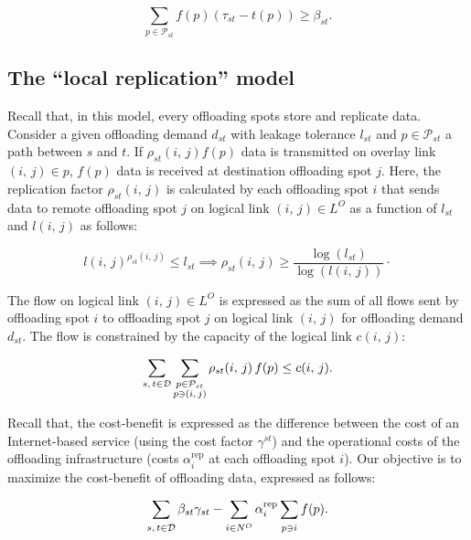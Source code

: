 \begin{equation}
    \sum_{p\in \mathcal{P}_{st}}f(p)\left(\tau_{st} - t(p)\right) \geq \beta_{st}.
    \label{eq:delay-constraint}
\end{equation}


\subsection{The ``local replication'' model}
\label{sec:rep-model}

Recall that, in this model, every offloading spots store and replicate data. Consider a given offloading demand $d_{st}$ with leakage tolerance $l_{st}$ and $p\in\mathcal{P}_{st}$ a path between $s$ and $t$. If $\rho_{st}(i,\,j)f(p)$ data is transmitted on overlay link $(i,\,j)\in p$, $f(p)$ data is received at destination offloading spot $j$. Here, the replication factor $\rho_{st}(i,\,j)$ is calculated by each offloading spot $i$ that sends data to remote offloading spot $j$ on logical link $(i,\,j)\in L^{O}$ as a function of $l_{st}$ and $l(i,\,j)$ as follows:

\begin{equation}
    l(i,\,j)^{\rho_{st}(i,\,j)}\leq l_{st} \implies
    \rho_{st}(i,\,j) \geq \frac{\log(l_{st})}{\log(l(i,\,j))}\cdot
\end{equation}

The flow on logical link $(i,\,j)\in L^{O}$ is expressed as the sum of all flows sent by offloading spot $i$ to offloading spot $j$ on logical link $(i,\,j)$ for offloading demand $d_{st}$. The flow is constrained by the capacity of the logical link $c(i,\,j)$:

\begin{equation}
    \sum_{s,\,t\in \mathcal{D}\vphantom{\mathcal{P}_{st}}} \sum_{\substack{p\in \mathcal{P}_{st}\\p\ni (i,\,j)}} \rho_{st}(i,\,j)\, f(p) \leq c(i,\,j).
\end{equation}

Recall that, the cost-benefit is expressed as the difference between the cost of an Internet-based service (using the cost factor $\gamma^{st}$) and the operational costs of the offloading infrastructure (costs $\alpha_{i}^{\text{rep}}$ at each offloading spot $i$). Our objective is to maximize the cost-benefit of offloading data, expressed as follows:

\begin{equation}
    \label{eq:total-revenue-obj}
    \sum_{s,\,t\in \mathcal{D}\vphantom{N^{O}}}\beta_{st}\gamma_{st} - \sum_{i\in N^{O}\vphantom{N^{O}}}\alpha_{i}^{\text{rep}} \sum_{p\ni i\vphantom{N^{O}}}f(p).
\end{equation}

